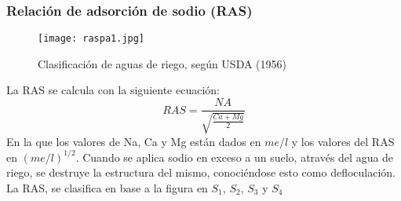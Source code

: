 \subsubsection{Relación de adsorción de sodio (RAS)}
\begin{figure}[h!]
\centering
  \texttt{[image: raspa1.jpg]}
  \caption{Clasificación de aguas de riego, según USDA (1956)\cite{keller1956results}}
  \label{raspa1}
\end{figure}
La RAS se calcula con la siguiente ecuación:
\begin{equation}
    RAS = \frac{NA}{\sqrt{\frac{Ca + Mg}{2}}}
\end{equation}
En la que los valores de Na, Ca y Mg están dados en $me/l$ y los valores del RAS en $(me/l)^{1/2}$. Cuando se aplica sodio en exceso a un suelo, através del agua de riego, se destruye la estructura del mismo, conociéndose esto como defloculación. La RAS, se clasifica en base a la figura en $S_1$, $S_2$, $S_3$ y $S_4$
